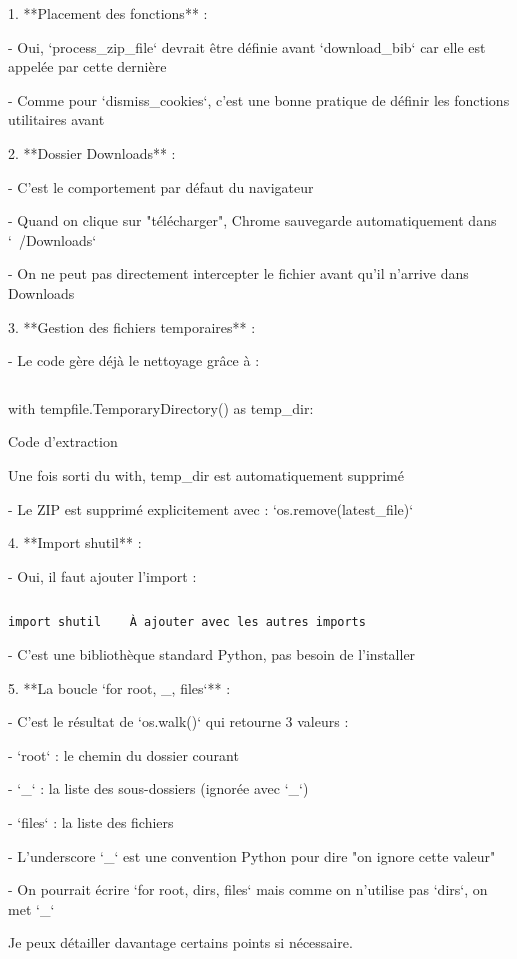 1. **Placement des fonctions** :

- Oui, `process\_zip\_file` devrait être définie avant `download\_bib` car elle est appelée par cette dernière

- Comme pour `dismiss\_cookies`, c'est une bonne pratique de définir les fonctions utilitaires avant

2. **Dossier Downloads** :

- C'est le comportement par défaut du navigateur

- Quand on clique sur "télécharger", Chrome sauvegarde automatiquement dans `~/Downloads`

- On ne peut pas directement intercepter le fichier avant qu'il n'arrive dans Downloads

3. **Gestion des fichiers temporaires** :

- Le code gère déjà le nettoyage grâce à :

\begin{verbatim}

\end{verbatim}

with tempfile.TemporaryDirectory() as temp\_dir:

  Code d'extraction

  Une fois sorti du with, temp\_dir est automatiquement supprimé


- Le ZIP est supprimé explicitement avec : `os.remove(latest\_file)`

4. **Import shutil** :

- Oui, il faut ajouter l'import :

\begin{verbatim}

\end{verbatim}
\begin{verbatim}
import shutil    À ajouter avec les autres imports

\end{verbatim}

- C'est une bibliothèque standard Python, pas besoin de l'installer

5. **La boucle `for root, \_, files`** :

- C'est le résultat de `os.walk()` qui retourne 3 valeurs :

- `root` : le chemin du dossier courant

- `\_` : la liste des sous-dossiers (ignorée avec `\_`)

- `files` : la liste des fichiers

- L'underscore `\_` est une convention Python pour dire "on ignore cette valeur"

- On pourrait écrire `for root, dirs, files` mais comme on n'utilise pas `dirs`, on met `\_`

Je peux détailler davantage certains points si nécessaire.